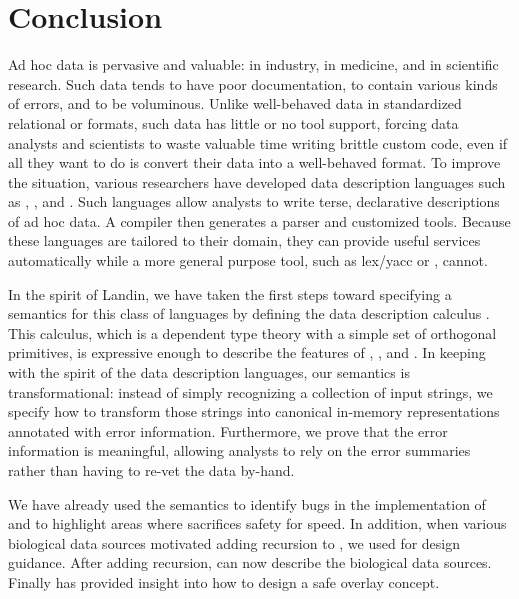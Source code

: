 \section{Conclusion} 
\label{sec:conclusion}
Ad hoc data is pervasive and valuable: in industry, in medicine, and in scientific research.  Such data tends to have poor documentation, to contain various kinds of errors, and to be voluminous.  Unlike well-behaved data in standardized relational or \xml{} formats, such data has little or no tool support, forcing data analysts and scientists to waste valuable time writing brittle custom code, even if all they want to do is convert their data into a well-behaved format.  To improve the situation, various researchers have developed data description languages such as \pads{}, \datascript{}, and \packettypes{}.  Such languages allow analysts to write terse, declarative descriptions of ad hoc data.  A compiler then generates a parser and customized tools.  Because these languages are tailored to their domain, they can provide useful services automatically while a more general purpose tool, such as lex/yacc or \perl{}, cannot.

In the spirit of Landin, we have taken the first steps toward specifying a semantics for this class of languages by defining the data description calculus \ddc{}.  This calculus, which is a dependent type theory with a simple set of orthogonal primitives, is expressive enough to describe the features of \pads{}, \datascript{}, and \packettypes{}.  In keeping with the spirit of the data description languages, our semantics is transformational: instead of simply recognizing a collection of input strings, we specify how to transform those strings into canonical in-memory representations annotated with error information.  Furthermore, we prove that the error information is meaningful, allowing analysts to rely on the error summaries rather than having to re-vet the data by-hand. 

We have already used the semantics to identify bugs in the implementation of \pads{} and to highlight areas where \pads{} sacrifices safety for speed. In addition, when various biological data sources motivated adding recursion to \pads{}, we used \ddc{} for design guidance.  After adding recursion, \pads
{} can now describe the biological data sources. Finally \ddc{} has provided insight into how to design a safe overlay concept. 